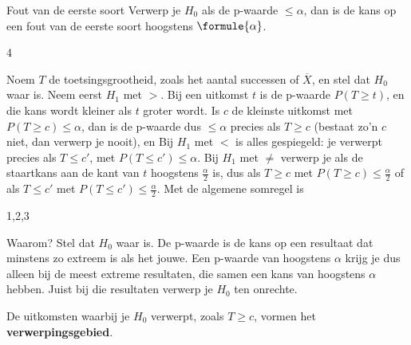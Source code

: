 \begin{theorie}
\begin{stelling}{Fout van de eerste soort}
Verwerp je $H_0$ als de p-waarde $\leqslant \alpha$, dan is de kans op een fout van de eerste soort hoogstens $\formule{\alpha}$.
\end{stelling}
\begin{alleenvoor}{4}

\begin{bewijs}
Noem $T$ de toetsingsgrootheid, zoals het aantal successen of $\overline{X}$, en stel dat $H_0$ waar is. Neem eerst $H_1$ met $>$. Bij een uitkomst $t$ is de p-waarde $P(T \geqslant t)$, en die kans wordt kleiner als $t$ groter wordt. Is $c$ de kleinste uitkomst met $P(T \geqslant c) \leqslant \alpha$, dan is de p-waarde dus $\leqslant \alpha$ precies als $T \geqslant c$ (bestaat zo'n $c$ niet, dan verwerp je nooit), en
Bij $H_1$ met $<$ is alles gespiegeld: je verwerpt precies als $T \leqslant c'$, met $P(T \leqslant c') \leqslant \alpha$. Bij $H_1$ met $\neq$ verwerp je als de staartkans aan de kant van $t$ hoogstens $\frac{\alpha}{2}$ is, dus als $T \geqslant c$ met $P(T \geqslant c) \leqslant \frac{\alpha}{2}$ of als $T \leqslant c'$ met $P(T \leqslant c') \leqslant \frac{\alpha}{2}$. Met de algemene somregel is
\end{bewijs}
\end{alleenvoor}
\end{theorie}
\begin{alleenvoor}{1,2,3}

Waarom? Stel dat $H_0$ waar is. De p-waarde is de kans op een resultaat dat minstens zo extreem is als het jouwe. Een p-waarde van hoogstens $\alpha$ krijg je dus alleen bij de meest extreme resultaten, die samen een kans van hoogstens $\alpha$ hebben. Juist bij die resultaten verwerp je $H_0$ ten onrechte.
\end{alleenvoor}

De uitkomsten waarbij je $H_0$ verwerpt, zoals $T \geqslant c$, vormen het \textbf{verwerpingsgebied}. 

